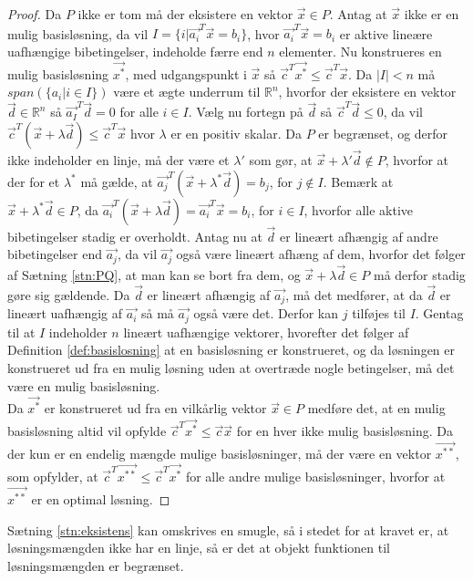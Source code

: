 \begin{proof}
Da $P$ ikke er tom må der eksistere en vektor $\vec{x} \in P$.
Antag at $\vec{x}$ ikke er en mulig basisløsning, da vil $I = \{i | \vec{a_i}^T\vec{x} = b_i\}$, hvor $\vec{a_i}^T\vec{x}=b_i$ er aktive lineære uafhængige bibetingelser, indeholde færre end $n$ elementer. 
Nu konstrueres en mulig basisløsning $\vec{x^*}$, med udgangspunkt i $\vec{x}$ så $\vec{c}^T\vec{x^*}\leq \vec{c}^T\vec{x}$.
Da $|I|<n $ må $span(\{a_i | i \in I\})$ være et ægte underrum til $\mathds{R}^n$, hvorfor der eksistere en vektor $\vec{d} \in \mathds{R}^n$ så $\vec{a_I}^T\vec{d}=0$ for alle $i \in I$. 
Vælg nu fortegn på $\vec{d}$ så $\vec{c}^T\vec{d} \leq 0$, da vil $\vec{c}^T(\vec{x}+\lambda\vec{d}) \leq \vec{c}^T\vec{x}$ hvor $\lambda$ er en positiv skalar.
Da $P$ er begrænset, og derfor ikke indeholder en linje, må der være et $\lambda'$ som gør, at $\vec{x}+\lambda'\vec{d} \notin P$, hvorfor at der for et $\lambda^*$ må gælde, at $\vec{a_j}^T(\vec{x}+\lambda^* \vec{d}) = b_j$, for $j \notin I$.
Bemærk at $\vec{x}+\lambda^*\vec{d} \in P$, da $\vec{a_i}^T(\vec{x}+\lambda\vec{d})= \vec{a_i}^T\vec{x} = b_i$, for $i \in I$, hvorfor alle aktive bibetingelser stadig er overholdt.
Antag nu at $\vec{d}$ er lineært afhængig af andre bibetingelser end $\vec{a_j}$, da vil $\vec{a_j}$ også være lineært afhæng af dem, hvorfor det følger af Sætning \ref{stn:PQ}, at man kan se bort fra dem, og $\vec{x}+\lambda \vec{d} \in P$ må derfor stadig gøre sig gældende. 
Da $\vec{d}$ er lineært afhængig af $\vec{a_j}$, må det medfører, at da $\vec{d}$ er lineært uafhængig af $\vec{a_i}$ så må $\vec{a_j}$ også være det. 
Derfor kan $j$ tilføjes til $I$. 
Gentag til at $I$ indeholder $n$ lineært uafhængige vektorer, hvorefter det følger af Definition \ref{def:basislosning} at en basisløsning er konstrueret, og da løsningen er konstrueret ud fra en mulig løsning uden at overtræde nogle betingelser, må det være en mulig basisløsning.\\
Da $\vec{x^*}$ er konstrueret ud fra en vilkårlig vektor $\vec{x}\in P$ medføre det, at en mulig basisløsning altid vil opfylde $\vec{c}^T\vec{x^*} \leq \vec{c}\vec{x}$ for en hver ikke mulig basisløsning. 
Da der kun er en endelig mængde mulige basisløsninger, må der være en vektor $\vec{x^{**}}$, som opfylder, at $\vec{c}^T\vec{x^{**}}\leq \vec{c}^T\vec{x^*}$ for alle andre mulige basisløsninger, hvorfor at $\vec{x^{**}}$ er en optimal løsning.
\end{proof}
Sætning \ref{stn:eksistens} kan omskrives en smugle, så i stedet for at kravet er, at løsningsmængden ikke har en linje, så er det at objekt funktionen til løsningsmængden er begrænset.
